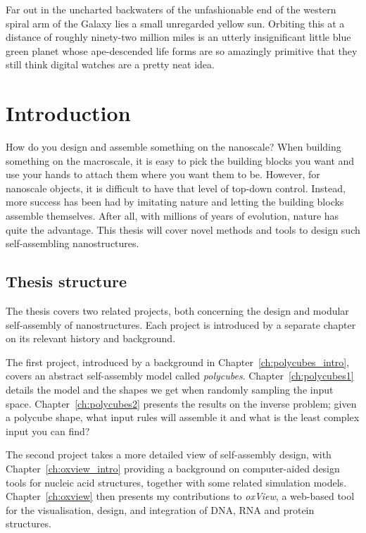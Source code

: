 \begin{savequote}[8cm]
Far out in the uncharted backwaters of the unfashionable end of the western spiral arm of the Galaxy lies a small unregarded yellow sun. Orbiting this at a distance of roughly ninety-two million miles is an utterly insignificant little blue green planet whose ape-descended life forms are so amazingly primitive that they still think digital watches are a pretty neat idea.
\end{savequote}

\chapter{Introduction}\label{ch:1-intro}

\minitoc

How do you design and assemble something on the nanoscale? When building something on the macroscale, it is easy to pick the building blocks you want and use your hands to attach them where you want them to be. However, for nanoscale objects, it is difficult to have that level of top-down control. Instead, more success has been had by imitating nature and letting the building blocks assemble themselves. After all, with millions of years of evolution, nature has quite the advantage. This thesis will cover novel methods and tools to design such self-assembling nanostructures.

\section{Thesis structure}
The thesis covers two related projects, both concerning the design and modular self-assembly of nanostructures. Each project is introduced by a separate chapter on its relevant history and background.

The first project, introduced by a background in Chapter~\ref{ch:polycubes_intro}, covers an abstract self-assembly model called \emph{polycubes}. Chapter~\ref{ch:polycubes1} details the model and the shapes we get when randomly sampling the input space. Chapter~\ref{ch:polycubes2} presents the results on the inverse problem; given a polycube shape, what input rules will assemble it and what is the least complex input you can find?

The second project takes a more detailed view of self-assembly design, with Chapter~\ref{ch:oxview_intro} providing a background on computer-aided design tools for nucleic acid structures, together with some related simulation models. Chapter~\ref{ch:oxview} then presents my contributions to \emph{oxView}, a web-based tool for the visualisation, design, and integration of DNA, RNA and protein structures.

